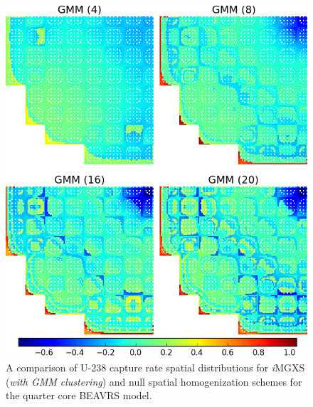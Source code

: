 \begin{figure}[h!]
\centering
\includegraphics[width=0.9\linewidth]{figures/results/compare/full-core/compare-capt-gmm}
\vspace{2mm}
\caption[U-238 capture rate comparison for the quarter core BEAVRS model]{A comparison of U-238 capture rate spatial distributions for \textit{i}\ac{MGXS} (\textit{with \ac{GMM} clustering}) and null spatial homogenization schemes for the quarter core BEAVRS model.}
\label{fig:chap11-assm-full-core-capt-rates-gmm-comp}
\end{figure}

\clearpage

